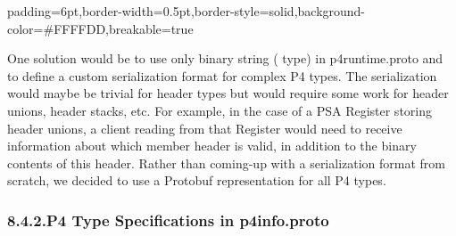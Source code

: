 \documentclass[11pt]{article}
\begin{document}
{%
\begin{mdbmargintb}{6pt}{6pt}%
\begin{mdblock}{padding=6pt,border-width=0.5pt,border-style=solid,background-color=\#FFFFDD,breakable=true}%
\begin{mdpre}%
\end{mdpre}%
\end{mdblock}%
\end{mdbmargintb}%

\noindent{}One solution would be to use only binary string ( type) in
p4runtime.proto and to define a custom serialization format for complex P4
types. The serialization would maybe be trivial for header types but would
require some work for header unions, header stacks, etc. For example, in the
case of a PSA Register storing header unions, a client reading from that
Register would need to receive information about which member header is valid,
in addition to the binary contents of this header. Rather than coming-up with a
serialization format from scratch, we decided to use a Protobuf representation
for all P4 types.%

\subsubsection{8.4.2.\hspace*{0.5em}P4 Type Specifications in p4info.proto}\label{sec-p4-type-specifications-in-p4infoproto}%

}
\end{document}
